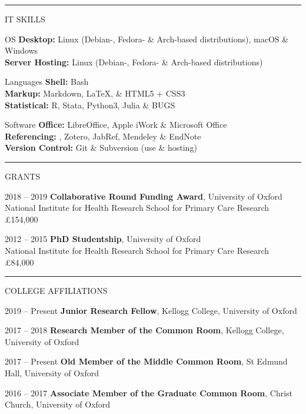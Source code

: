 \documentclass[10pt,a4paper]{article}
\begin{document}
\noindent\rule{\textwidth}{0.4pt}
\begin{cvlist}{IT SKILLS}
	
	\item[OS]
	\textbf{Desktop:} Linux (Debian-, Fedora- \& Arch-based distributions), macOS \& Windows \\
	\textbf{Server Hosting:} Linux (Debian-, Fedora- \& Arch-based distributions)
	
	\item[Languages]
	\textbf{Shell:} Bash \\
	\textbf{Markup:} Markdown, \LaTeX , \& HTML5 + CSS3 \\
	\textbf{Statistical:} R, Stata, Python3, Julia \& BUGS
	
	\item[Software]
	\textbf{Office:} LibreOffice, Apple iWork \& Microsoft Office \\
	\textbf{Referencing:} , Zotero, JabRef, Mendeley \& EndNote \\
	\textbf{Version Control:} Git \& Subversion (use \& hosting)
	
\end{cvlist}


\noindent\rule{\textwidth}{0.4pt}
\begin{cvlist}{GRANTS}
	
	\item[2018 -- 2019]
	\textbf{Collaborative Round Funding Award}, University of Oxford \\
	National Institute for Health Research School for Primary Care Research \\
	\pounds 154,000
	
	\item[2012 -- 2015]
	\textbf{PhD Studentship}, University of Oxford \\
	National Institute for Health Research School for Primary Care Research \\
	\pounds 84,000
	
\end{cvlist}


\noindent\rule{\textwidth}{0.4pt}
\begin{cvlist}{COLLEGE AFFILIATIONS}
	
	\item[2019 -- Present]
	\textbf{Junior Research Fellow}, Kellogg College, University of Oxford
	
	\item[2017 -- 2018]
	\textbf{Research Member of the Common Room}, Kellogg College, University of Oxford
	
	\item[2017 -- Present]
	\textbf{Old Member of the Middle Common Room}, St Edmund Hall, University of Oxford
	
	\item[2016 -- 2017]
	\textbf{Associate Member of the Graduate Common Room}, Christ Church, University of Oxford
	
\end{cvlist}
\end{document}
